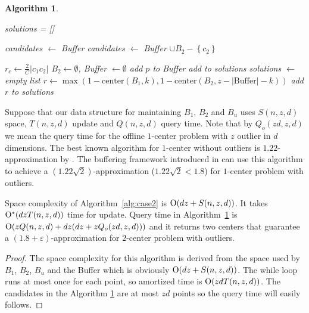 \documentclass[envcountsame]{cls/cccg15}
\newtheorem{algorithm}{Algorithm}
\newcommand{\cO}{\ensuremath{{\rm O}}}
\newcommand{\set}[1]{\left\{ #1 \right\}}
\newcommand{\card}[1]{\left|{#1}\right|}
\newcommand{\gee}{\geqslant}
\renewcommand{\geq}{\gee}
\newcommand{\eps}{\varepsilon}
\begin{document}
\begin{algorithm}
\label{alg:query}
\leavevmode
\begin{algorithmic}
	\State solutions = []
	
	\If {$\card{B_2} \geq (d+1)(z+1)$}
		\State candidates $\gets$ Buffer
	\Else
		\State candidates $\gets$ Buffer $\cup B_2 - \set{c_2}$
	\EndIf

		\State $r_c \gets \frac{2}{C} \card{c_1 c_2}$
		\State $B_2 \gets \emptyset$, Buffer $\gets \emptyset$ 
				\State add $p$ to Buffer
			\EndIf
		\EndFor
		\State add  to solutions
	\EndFor
	\State \Return {}
\EndFunction
\Statex
{}
	\State solutions $\gets$ empty list
	\For{$k \gets 0, \dots,(z - \card{\mbox{Buffer}})$}
		\State $r \gets \max(1-\mbox{center}(B_1, k), 1-\mbox{center}(B_2, z - \card{\mbox{Buffer}} - k))$
		\State add $r$ to solutions
	\EndFor
	\State \Return {}
\EndFunction
\end{algorithmic}
\end{algorithm}


Suppose that our data structure for maintaining $B_1$, $B_2$ and $B_u$ uses $S(n,z,d)$ space, $T(n,z,d)$ update and $Q(n,z,d)$ query time. Note that by $Q_{o}(zd,z,d)$ we mean the query time for the offline $1$-center problem with $z$ outlier in $d$ dimensions. The best known algorithm for $1$-center without outliers is $1.22$-approximation by \cite{chan2014streaming, agarwal2010streaming}. The buffering framework introduced in \cite{zarrabi2009streaming} can use this algorithm to achieve a $(1.22\sqrt{2})$-approximation ($1.22\sqrt{2} < 1.8$) for $1$-center problem with outliers.

\begin{theorem}
\label{thm:2nd-cmplx}
Space complexity of Algorithm~\ref{alg:case2} is $\cO(dz+S(n,z,d))$. It takes $\cO^*(dzT(n,z,d))$ time for update. Query time in Algorithm~\ref{alg:query} is $\cO(zQ(n,z,d) + dz(dz+zQ_o(zd,z,d)))$ and it returns two centers that guarantee a $(1.8 + \eps)$-approximation for $2$-center problem with outliers.
\end{theorem}

\begin{proof}
The space complexity for this algorithm is derived from the space used by $B_1$, $B_2$, $B_u$ and the Buffer which is obviously $\cO(dz+S(n,z,d))$. The while loop runs at most once for each point, so amortized time is $\cO(zdT(n,z,d))$. The candidates in the Algorithm \ref{alg:query} are at most $zd$ points  so the query time will easily follows.
\end{proof}
\end{document}
